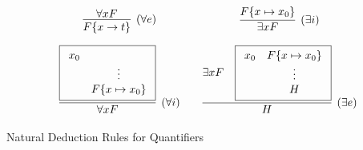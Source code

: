 \begin{table}[hbt]
	\begin{gather*}
	\begin{array}{ccc}
	\infer[(\forall e)]{F\{x\to t\}}{
		\forall x F
	}
	&&
		\infer[(\exists i)]{\exists x F}{
		F\{x\mapsto x_0 \}
	}
	\\[1em]
	\infer[(\forall i)]{\forall x F}{
		\boxed{\begin{array}{cc}x_0\\&\vdots\\&F\{x\mapsto x_0\}\end{array}}
	}
	&&
	\infer[(\exists e)]{H}{
		\exists x F &
		\boxed{\begin{array}{cc}x_0&F\{x\mapsto x_0 \}\\&\vdots\\&H\end{array}}
	}
	\end{array}
	\end{gather*}
	\caption{Natural Deduction Rules for Quantifiers}
	\label{tab:natural:deduction:quantifiers}
\end{table}
